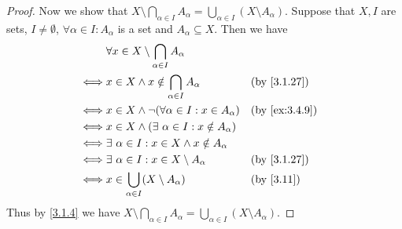 \begin{proof}
  Now we show that \(X \setminus \bigcap_{\alpha \in I} A_{\alpha} = \bigcup_{\alpha \in I} (X \setminus A_{\alpha})\).
  Suppose that \(X, I\) are sets, \(I \neq \emptyset\), \(\forall \alpha \in I : A_{\alpha}\) is a set and \(A_{\alpha} \subseteq X\).
  Then we have
  \begin{align*}
         & \forall x \in X \setminus \bigcap_{\alpha \in I} A_{\alpha}                                   \\
    \iff & x \in X \land x \notin \bigcap_{\alpha \in I} A_{\alpha}     &  & \text{(by \cref{3.1.27})}   \\
    \iff & x \in X \land \lnot(\forall \alpha \in I : x \in A_{\alpha}) &  & \text{(by \cref{ex:3.4.9})} \\
    \iff & x \in X \land (\exists\ \alpha \in I : x \notin A_{\alpha})                                   \\
    \iff & \exists\ \alpha \in I : x \in X \land x \notin A_{\alpha}                                     \\
    \iff & \exists\ \alpha \in I : x \in X \setminus A_{\alpha}         &  & \text{(by \cref{3.1.27})}   \\
    \iff & x \in \bigcup_{\alpha \in I} (X \setminus A_{\alpha})        &  & \text{(by \cref{3.11})}     \\
  \end{align*}
  Thus by \cref{3.1.4} we have \(X \setminus \bigcap_{\alpha \in I} A_{\alpha} = \bigcup_{\alpha \in I} (X \setminus A_{\alpha})\).
\end{proof}